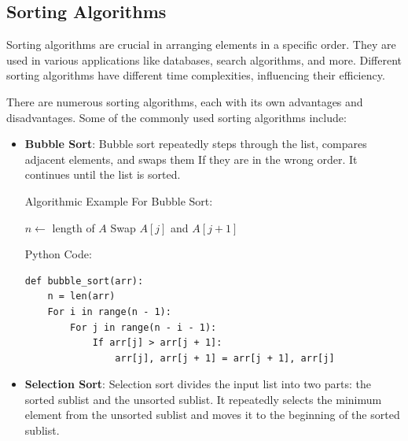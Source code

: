 \documentclass[12pt]{book} %
\begin{document}
\subsection{Sorting Algorithms}
Sorting algorithms are crucial in arranging elements in a specific order. They are used in various applications like databases, search algorithms, and more. Different sorting algorithms have different time complexities, influencing their efficiency.

There are numerous sorting algorithms, each with its own advantages and disadvantages. Some of the commonly used sorting algorithms include:

\begin{itemize}
    \item \textbf{Bubble Sort}: Bubble sort repeatedly steps through the list, compares adjacent elements, and swaps them If they are in the wrong order. It continues until the list is sorted.

     Algorithmic Example For Bubble Sort:
     \FloatBarrier %
    \begin{algorithm}
\caption{Bubble Sort}
\begin{algorithmic}[1]
    \State $n \gets$ length of $A$
                \State Swap $A[j]$ and $A[j+1]$
            \EndIf
        \EndFor
    \EndFor
\EndFunction
\end{algorithmic}
\end{algorithm}
\FloatBarrier %
Python Code:
\FloatBarrier %
\begin{verbatim}
def bubble_sort(arr):
    n = len(arr)
    For i in range(n - 1):
        For j in range(n - i - 1):
            If arr[j] > arr[j + 1]:
                arr[j], arr[j + 1] = arr[j + 1], arr[j]
\end{verbatim}
    \item \textbf{Selection Sort}: Selection sort divides the input list into two parts: the sorted sublist and the unsorted sublist. It repeatedly selects the minimum element from the unsorted sublist and moves it to the beginning of the sorted sublist.
    

\end{itemize}
\end{document}
